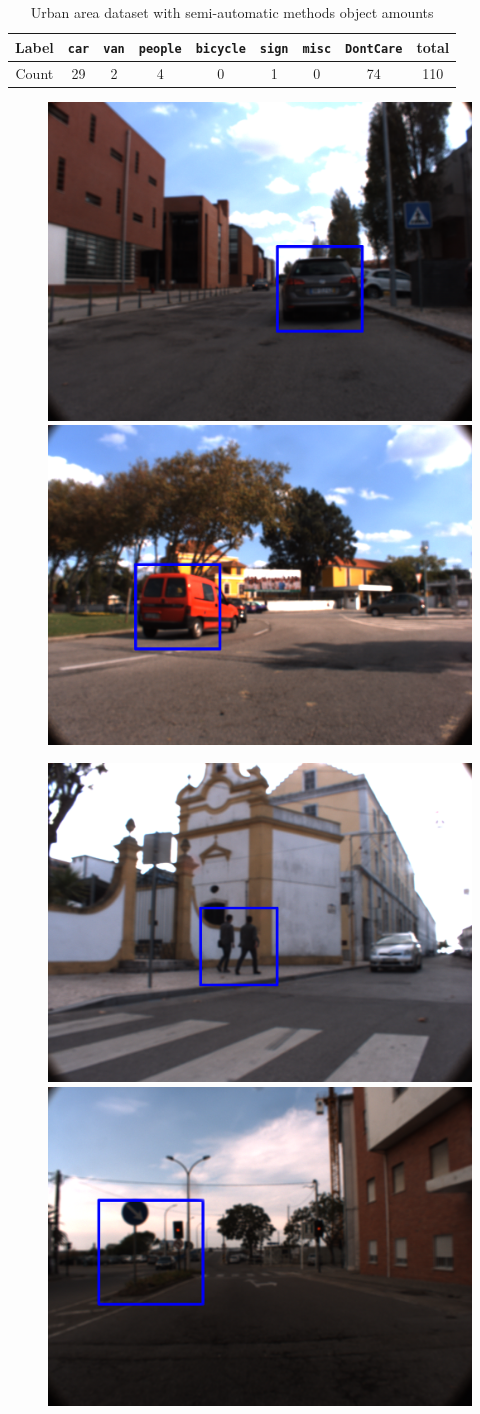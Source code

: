 \begin{table}[htp]
	\centering
	\caption{Urban area dataset  with semi-automatic methods object amounts}
	\label{tab: urban1stats}
	\begin{tabular}{c|c|c|c|c|c|c|c|c}
		\textbf{Label} & \texttt{car} & \texttt{van} & \texttt{people} & \texttt{bicycle} & \texttt{sign} & \texttt{misc} & \texttt{DontCare} & \textbf{total} \\ \hline
		Count          & 29           & 2            & 4               & 0                & 1             & 0             & 74                & 110           
	\end{tabular}
\end{table}

\begin{figure}[htp]
	
	\centering
	
	\includegraphics[width=.49\textwidth]{capresults/imgs/car2.png}
	\includegraphics[width=.49\textwidth]{capresults/imgs/van2.png}
	
	\includegraphics[width=.49\textwidth]{capresults/imgs/people2.png}
	\includegraphics[width=.49\textwidth]{capresults/imgs/sign2.png}
	

\end{figure}
